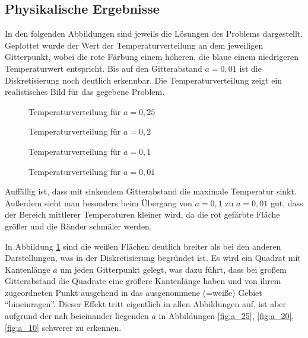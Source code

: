 \documentclass[10pt,a4paper]{article}
\begin{document}
\subsection{Physikalische Ergebnisse}
In den folgenden Abbildungen sind jeweils die Lösungen des Problems dargestellt. Geplottet wurde der Wert der Temperaturverteilung an dem jeweiligen Gitterpunkt, wobei die rote Färbung einem höheren, die blaue einem niedrigeren Temperaturwert entspricht. Bis auf den Gitterabstand $a=0,01$ ist die Diskretisierung noch deutlich erkennbar.
Die Temperaturverteilung zeigt ein realistisches Bild für das gegebene Problem.
\begin{figure}[htbp!]
\begin{minipage}[c]{0.5\linewidth}
\centering
\vspace{-40pt}
\scalebox{0.85}{}
\vspace{-40pt}
\caption{Temperaturverteilung für $a=0,25$}
\label{fig:a_25}
\end{minipage}
\begin{minipage}[c]{0.5\linewidth}
\centering
\vspace{-40pt}
\scalebox{0.85}{}
\vspace{-40pt}
\caption{Temperaturverteilung für $a=0,2$}
\label{fig:a_20}
\end{minipage}
\begin{minipage}[c]{0.5\linewidth}
\centering
\vspace{-40pt}
\scalebox{0.85}{}
\vspace{-40pt}
\caption{Temperaturverteilung für $a=0,1$}
\label{fig:a_10}
\end{minipage}
\begin{minipage}[c]{0.5\linewidth}
\centering
\vspace{-40pt}
\scalebox{0.85}{}
\vspace{-40pt}
\caption{Temperaturverteilung für $a=0,01$}
\label{fig:a_1}
\end{minipage}
\end{figure}
Auffällig ist, dass mit sinkendem Gitterabstand die maximale Temperatur sinkt. Außerdem sieht man besonders beim Übergang von $a=0,1$  zu $a=0,01$ gut, dass der Bereich mittlerer Temperaturen kleiner wird, da die rot gefärbte Fläche größer und die Ränder schmäler werden.

In Abbildung \ref{fig:a_1} sind die weißen Flächen deutlich breiter als bei den anderen Darstellungen, was in der Diskretisierung begründet ist. Es wird ein Quadrat mit Kantenlänge $a$ um jeden Gitterpunkt gelegt, was dazu führt, dass bei großem Gitterabstand die Quadrate eine größere Kantenlänge haben und von ihrem zugeordneten Punkt ausgehend in das ausgenommene (=weiße) Gebiet "`hineinragen"'. Dieser Effekt tritt eigentlich in allen Abbildungen auf, ist aber aufgrund der nah beieinander liegenden $a$ in Abbildungen \ref{fig:a_25}, \ref{fig:a_20}, \ref{fig:a_10} schwerer zu erkennen.
\end{document}
